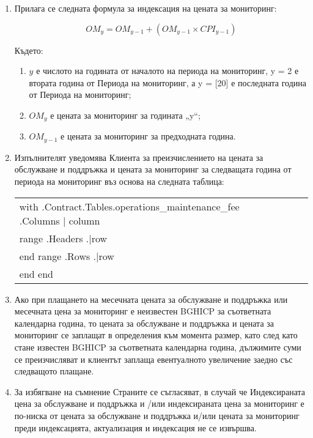 \begin{enumerate}[label=\arabic*.]
\item Прилага се следната формула за индексация на цената за мониторинг:

        \[ OM_y = OM_{y-1} + (OM_{y-1} \times CPI_{y-1}) \]

        Където:
        \begin{enumerate}
        \item $y$ е числото на годината от началото на периода на мониторинг, y = 2 е втората година от Периода на мониторинг, а y = [20] е последната година от Периода на мониторинг;
        \item $OM_y$ е цената за мониторинг за годината „y“;
          \item $OM_{y-1}$ е цената за мониторинг за предходната година.
          \end{enumerate}

          \item Изпълнителят уведомява Клиента за преизчислението на цената за обслужване и поддръжка и цената за мониторинг за следващата година от периода на мониторинг въз основа на следната таблица:


\begin{center}
\begin{tabu}{|X|X|X|X|X|X|} \tabucline{}
{{with .Contract.Tables.operations_maintenance_fee}} %
	{{.Columns | column}} \\\tabucline{}
	{{range .Headers}} {{.|row}} \\\tabucline{} {{end}} %
	{{range .Rows}} {{.|row}} \\\tabucline{} {{end}} %
{{end}}
\end{tabu}
\end{center}

\item Ако при плащането на месечната цената за обслужване и поддръжка или месечната цена за мониторинг е неизвестен BGHICP за съответната календарна година, то цената за обслужване и поддръжка и цената за мониторинг се заплащат в определения към момента размер, като след като стане известен BGHICP за съответната календарна година, дължимите суми се преизчисляват и клиентът заплаща евентуалното увеличение заедно със следващото плащане.
\item За избягване на съмнение Страните се съгласяват, в случай че Индексираната цена за обслужване и поддръжка и /или индексираната цена за мониторинг е по-ниска от цената за обслужване и поддръжка и/или цената за мониторинг преди индексацията, актуализация и индексация не се извършва.
\end{enumerate}
